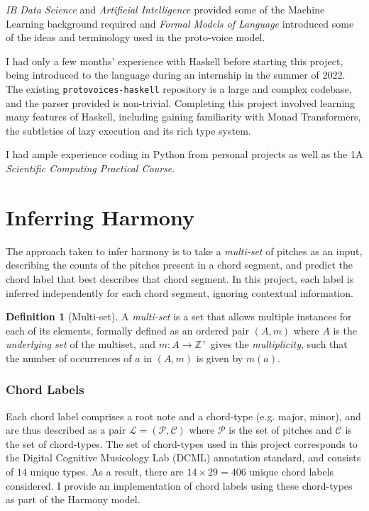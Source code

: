 \documentclass[12pt,a4paper,twoside,openany]{report} \usepackage[pdfborder={0 0 0}]{hyperref}    %
\theoremstyle{definition} \newtheorem{definition}{Definition}[section]
\begin{document}
\textit{IB Data Science} and \textit{Artificial Intelligence} provided some of the Machine Learning background required
and \textit{Formal Models of Language} introduced some of the ideas and terminology used in the proto-voice model.

I had only a few months' experience with Haskell before starting this project, being introduced to the language during an internship in the summer of 2022. 
The existing \texttt{protovoices-haskell} repository is a large and complex codebase, and the parser provided is non-trivial. 
Completing this project involved learning many features of Haskell, including gaining familiarity with Monad Transformers, the subtleties of lazy execution and its rich type system.

I had ample experience coding in Python from personal projects as well as the 1A \textit{Scientific
Computing Practical Course}.

\section{Inferring Harmony}
\label{sec:inferringHarmony}

The approach taken to infer harmony is to take a \textit{multi-set} of pitches as an input, describing the counts of the pitches present in a chord segment, and predict the chord label that best describes that chord segment.
In this project, each label is inferred independently for each chord segment, ignoring contextual information.

\begin{definition}[Multi-set] A \textit{multi-set} is a set that allows multiple instances for each of its elements,
formally defined as an ordered pair $(A,m)$ where $A$ is the \textit{underlying set} of the multiset, and $m:A \to
\mathbb{Z}^+$ gives the \textit{multiplicity}, such that the number of occurrences of $a$ in $(A,m)$ is given by $m(a)$.
\end{definition}

\subsubsection{Chord Labels}
\label{sub:chordTypes}

Each chord label comprises a root note and a chord-type (e.g. major, minor), and are thus described as a pair $\mathcal{L}
= (\mathcal{P}, \mathcal{C})$ where $\mathcal{P}$ is the set of pitches and $\mathcal{C}$ is the set of chord-types. 
The set of chord-types used in this project corresponds to the Digital Cognitive Musicology Lab (DCML)
annotation standard, and consists of $14$ unique types. As a result, there are $14 \times 29 = 406$ unique chord labels
considered. I provide an implementation of chord labels using these
chord-types as part of the Harmony model.
\end{document}
